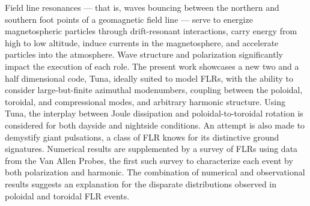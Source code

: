 
Field line resonances --- that is, \Alfven waves bouncing between the northern
and southern foot points of a geomagnetic field line --- serve to energize
magnetospheric particles through drift-resonant interactions, carry energy from
high to low altitude, induce currents in the magnetosphere, and accelerate
particles into the atmosphere. Wave structure and polarization significantly
impact the execution of each role. The present work showcases a new two and a
half dimensional code, Tuna, ideally suited to model FLRs, with the ability to
consider large-but-finite azimuthal modenumbers, coupling between the poloidal,
toroidal, and compressional modes, and arbitrary harmonic structure. Using
Tuna, the interplay between Joule dissipation and poloidal-to-toroidal rotation
is considered for both dayside and nightside conditions. An attempt is also
made to demystify giant pulsations, a class of FLR knows for its distinctive
ground signatures. Numerical results are supplemented by a survey of 
FLRs using data from the Van Allen Probes, the first such survey to
characterize each event by both polarization and harmonic. The combination of
numerical and observational results suggests an explanation for the disparate
distributions observed in poloidal and toroidal FLR events. 



